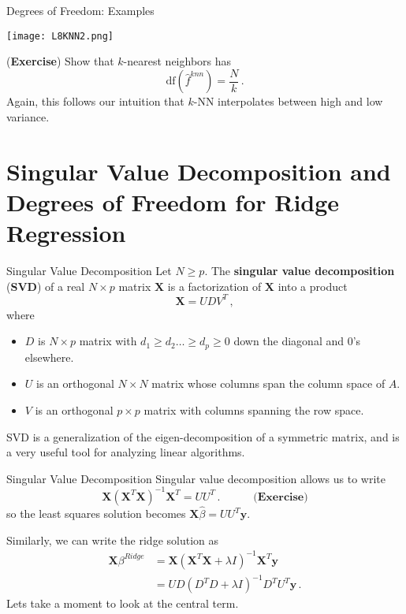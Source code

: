 \documentclass[10pt, table, dvipsnames,xcdraw,handout]{beamer}
\newcommand{\bfX}{\ensuremath{\mathbf{X}}}
\newcommand{\bfy}{\ensuremath{\mathbf{y}}}
\begin{document}
\begin{frame}[fragile]{Degrees of Freedom: Examples} 
  \begin{minipage}[t][0.5\textheight][t]{\textwidth}
	\centering \texttt{[image: L8KNN2.png]} 
  \end{minipage}
  \vfill
\begin{minipage}[t][0.5\textheight][t]{\textwidth}
(\textbf{Exercise}) Show that $k$-nearest neighbors has 
$$
\text{df}(\hat{f}^{knn}) = \frac{N}{k}\,.
$$
Again, this follows our intuition that $k$-NN interpolates between high and low variance. 
\end{minipage}

\end{frame}






\section{Singular Value Decomposition and Degrees of Freedom for Ridge Regression}


\begin{frame}[fragile]{Singular Value Decomposition} 
Let $N\geq p$. The \textbf{singular value decomposition} (\textbf{SVD}) of a real $N\times p$ matrix $\bfX$ is a factorization of $\bfX$ into a product
$$
\bfX = UDV^T\,,
$$
where 
\begin{itemize}
\item[] $D$ is $N\times p$ matrix with $d_1\geq d_2\ldots\geq d_p \geq 0$ down the diagonal and 0's elsewhere. \pause
\item[] $U$ is an orthogonal $N\times N$ matrix whose columns span the column space of $A$.\pause
\item[] $V$ is an orthogonal $p\times p$ matrix with columns spanning the row space. \pause
\end{itemize}

SVD is a generalization of the eigen-decomposition of a symmetric matrix, and is a very useful tool for analyzing linear algorithms. 
\end{frame}





\begin{frame}[fragile]{Singular Value Decomposition} 
Singular value decomposition allows us to write
$$
\bfX (\bfX^T\bfX)^{-1}\bfX^T = UU^T\,.\hspace{3em}\textbf{(Exercise)}
$$
so the least squares solution becomes $\bfX \hat \beta = UU^T\bfy$. \pause

Similarly, we can write the ridge solution as 
\begin{align*}
\bfX \beta^{Ridge} &= \bfX(\bfX^T\bfX + \lambda I)^{-1}\bfX^T\bfy
\\
&= UD(D^TD + \lambda I)^{-1}D^TU^T \bfy\,.
\end{align*}\pause
Lets take a moment to look at the central term.
\end{frame}
\end{document}
